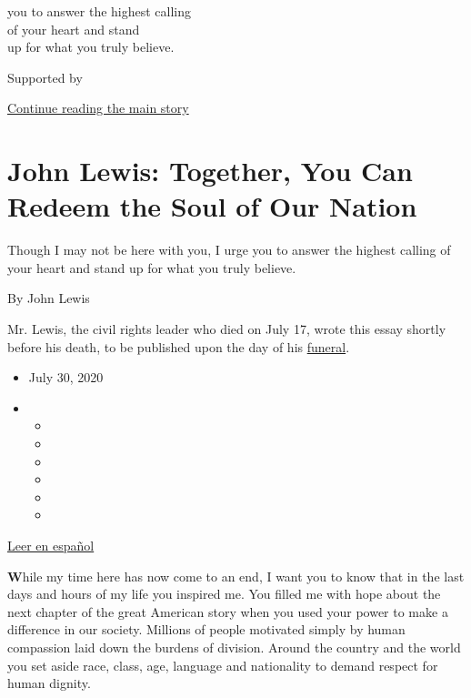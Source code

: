 you to answer the highest calling\\
of your heart and stand\\
up for what you truly believe.

Supported by

\protect\hyperlink{after-sponsor}{Continue reading the main story}

\hypertarget{john-lewis-together-you-can-redeem-the-soul-of-our-nation}{%
\section{John Lewis: Together, You Can Redeem the Soul of Our
Nation}\label{john-lewis-together-you-can-redeem-the-soul-of-our-nation}}

Though I may not be here with you, I urge you to answer the highest
calling of your heart and stand up for what you truly believe.

By John Lewis

Mr. Lewis, the civil rights leader who died on July 17, wrote this essay
shortly before his death, to be published upon the day of his
\href{https://www.nytimes.com/2020/07/30/us/john-lewis-live-funeral.html}{funeral}.

\begin{itemize}
\item
  July 30, 2020
\item
  \begin{itemize}
  \item
  \item
  \item
  \item
  \item
  \item
  \end{itemize}
\end{itemize}

\href{https://www.nytimes.com/es/2020/07/30/espanol/opinion/john-lewis-derechos-civiles.html}{Leer
en español}

\textbf{W}hile my time here has now come to an end, I want you to know
that in the last days and hours of my life you inspired me. You filled
me with hope about the next chapter of the great American story when you
used your power to make a difference in our society. Millions of people
motivated simply by human compassion laid down the burdens of division.
Around the country and the world you set aside race, class, age,
language and nationality to demand respect for human dignity.

